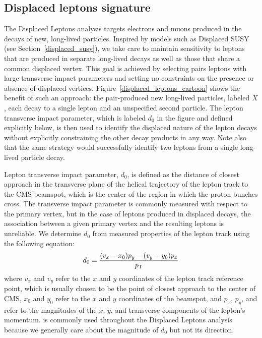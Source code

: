 \subsection{Displaced leptons signature}
The Displaced Leptons analysis targets electrons and muons produced in the decays of new, long-lived particles. Inspired by models such as Displaced SUSY (see Section~\ref{displaced_susy}), we take care to maintain sensitivity to leptons that are produced in separate long-lived decays as well as those that share a common displaced vertex. This goal is achieved by selecting pairs leptons with large transverse impact parameters and setting no constraints on the presence or absence of displaced vertices. Figure~\ref{displaced_leptons_cartoon} shows the benefit of such an approach: the pair-produced new long-lived particles, labeled $X$, each decay to a single lepton and an unspecified second particle. The lepton transverse impact parameter, which is labeled $d_0$ in the figure and defined explicitly below, is then used to identify the displaced nature of the lepton decays without explicitly constraining the other decay products in any way. Note also that the same strategy would successfully identify two leptons from a single long-lived particle decay.



Lepton transverse impact parameter, $d_0$, is defined as the distance of closest approach in the transverse plane of the helical trajectory of the lepton track to the CMS beamspot, which is the center of the region in which the proton bunches cross. The transverse impact parameter is commonly measured with respect to the primary vertex, but in the case of leptons produced in displaced decays, the association between a given primary vertex and the resulting leptons is unreliable. We determine $d_0$ from measured properties of the lepton track using the following equation:
\begin{equation}
    d_0 = \frac{(v_x - x_0)p_y - (v_y - y_0)p_x}{p_{\mathrm{T}}}
\end{equation}
where $v_x$ and $v_y$ refer to the $x$ and $y$ coordinates of the lepton track reference point, which is usually chosen to be the point of closest approach to the center of CMS, $x_0$ and $y_0$ refer to the $x$ and $y$ coordinates of the beamspot, and $p_x$, $p_y$, and \pt refer to the magnitudes of the $x$, $y$, and transverse components of the lepton's momentum. \ad is commonly used throughout the Displaced Leptons analysis because we generally care about the magnitude of $d_0$ but not its direction.

